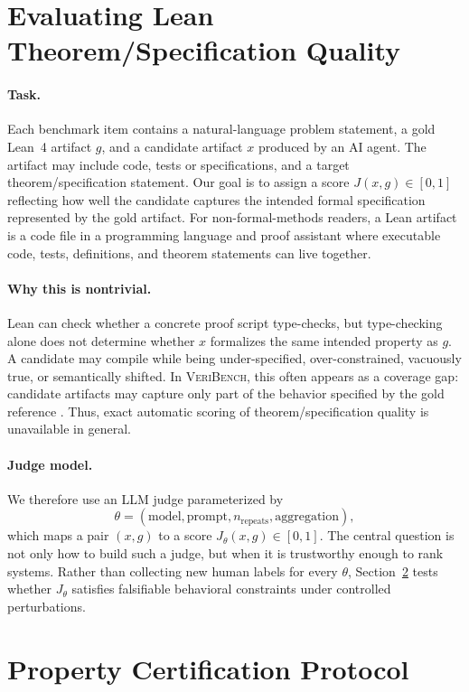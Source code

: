 \documentclass{article}
\begin{document}
\section{Evaluating Lean Theorem/Specification Quality}\label{sec:problem-setup}
\paragraph{Task.}
Each benchmark item contains a natural-language problem statement, a gold Lean~4 artifact
$g$, and a candidate artifact $x$ produced by an AI agent. The artifact may include code,
tests or specifications, and a target theorem/specification statement. Our goal is
to assign a score $J(x,g) \in [0,1]$ reflecting how well the candidate captures the intended formal specification represented
by the gold artifact.
For non-formal-methods readers, a Lean artifact is a code file in a programming language and proof assistant where executable code, tests, definitions, and theorem statements can live together.

\paragraph{Why this is nontrivial.}
Lean can check whether a concrete proof script type-checks, but type-checking alone does
not determine whether $x$ formalizes the same intended property as $g$. A candidate may
compile while being under-specified, over-constrained, vacuously true, or semantically
shifted. In \textsc{VeriBench}, this often appears as a coverage gap: candidate artifacts
may capture only part of the behavior specified by the gold reference
\citep{miranda2026veribench}. Thus, exact automatic scoring of theorem/specification quality is unavailable in
general.

\paragraph{Judge model.}
We therefore use an LLM judge parameterized by
\[
  \theta = (\text{model}, \text{prompt}, n_{\mathrm{repeats}}, \text{aggregation}),
\]
which maps a pair $(x,g)$ to a score $J_\theta(x,g)\in[0,1]$. The central question is not
only how to build such a judge, but when it is trustworthy enough to rank systems. Rather
than collecting new human labels for every $\theta$, Section~\ref{sec:property-protocol} tests whether $J_\theta$
satisfies falsifiable behavioral constraints under controlled perturbations.

\section{Property Certification Protocol}\label{sec:property-protocol}
\end{document}
